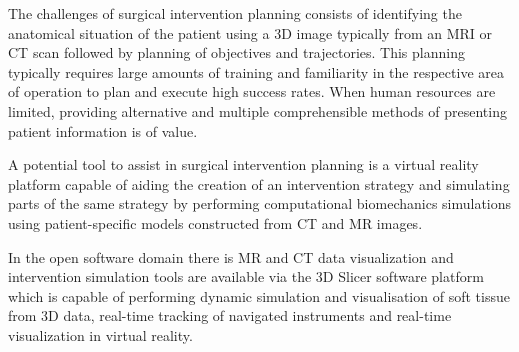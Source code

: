 



The challenges of surgical intervention planning consists of identifying the anatomical situation of the patient using a 3D image typically from an MRI or CT scan followed by planning of objectives and trajectories. This planning typically requires large amounts of training and familiarity in the respective area of operation to plan and execute high success rates. When human resources are limited, providing alternative and multiple comprehensible methods of presenting patient information is of value.


A potential tool to assist in surgical intervention planning is a virtual reality platform capable of aiding the creation of an intervention strategy and simulating parts of the same strategy by performing computational biomechanics simulations using patient-specific models constructed from CT and MR images.


In the open software domain there is MR and CT data visualization and intervention simulation tools are available via the 3D Slicer software platform which is capable of performing dynamic simulation and visualisation of soft tissue from 3D data, real-time tracking of navigated instruments \cite{Ungi2016} and real-time visualization in virtual reality.

